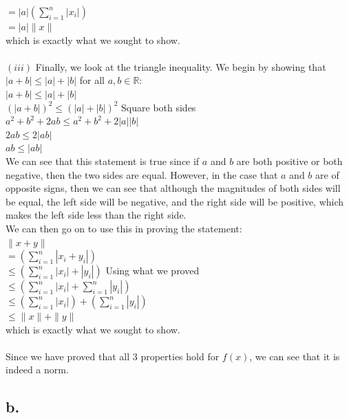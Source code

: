\documentclass{article}
\newcommand{\field}[1]{\mathbb{#1}}
\newcommand{\1}{\mathbf{1}}
\newcommand{\R}{\field{R}} %
\begin{document}
{$ = |a| (\sum_{i=1}^{n} |x_i|)$ \\
$ = |a| \|x\|$ \\
which is exactly what we sought to show. \\ \\
$(iii)$ Finally, we look at the triangle inequality. We begin by showing that $|a + b| \leq |a| + |b|$ for all $a, b \in \R$: \\
$|a + b| \leq |a| + |b|$ \\
$(|a + b|)^2 \leq (|a| + |b|)^2$ \hfill Square both sides \\
$a^2 + b^2 + 2ab \leq a^2 + b^2 + 2|a||b|$ \\
$2ab \leq 2|ab|$ \\
$ab \leq |ab|$ \\ 
We can see that this statement is true since if $a$ and $b$ are both positive or both negative, then the two sides are equal. However, in the case that $a$ and $b$ are of opposite signs, then we can see that although the magnitudes of both sides will be equal, the left side will be negative, and the right side will be positive, which makes the left side less than the right side. \\
We can then go on to use this in proving the statement: \\
$\|x + y\| $ \\ 
$= (\sum_{i=1}^{n} |x_i + y_i|) $ \\
$\leq (\sum_{i=1}^{n} |x_i| + |y_i|) $ \hfill Using what we proved \\
$\leq (\sum_{i=1}^{n} |x_i| + \sum_{i=1}^{n} |y_i|) $ \\
$\leq (\sum_{i=1}^{n} |x_i|) + (\sum_{i=1}^{n} |y_i|) $ \\
$\leq \|x\| + \|y\|$ \\
which is exactly what we sought to show. \\ \\
Since we have proved that all 3 properties hold for $f(x)$, we can see that it is indeed a norm. 

\subsection*{b.}

}
\end{document}
